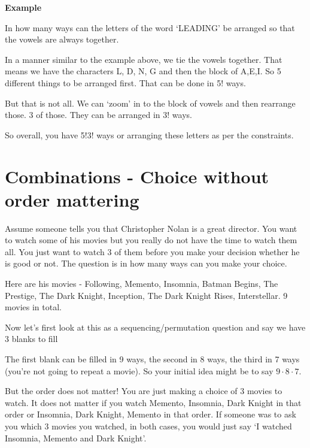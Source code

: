 \documentclass[12pt]{article}
\begin{document}
\medskip

\textbf{Example}

In how many ways can the letters of the word `LEADING' be arranged so that the vowels are always together.

In a manner similar to the example above, we tie the vowels together. That means we have the characters L, D, N, G and then the block of A,E,I. So 5 different things to be arranged first. 
That can be done in 5! ways. 

But that is not all. We can `zoom' in to the block of vowels and then rearrange those. 3 of those. They can be arranged in 3! ways.

So overall, you have 5!3! ways or arranging these letters as per the constraints.

\section*{Combinations - Choice without order mattering}

Assume someone tells you that Christopher Nolan is a great director. You want to watch some of his movies but you really do not have the time to watch them all. You just want to watch 3 of them before you make your decision whether he is good or not. The question is in how many ways can you make your choice.

Here are his movies - {Following, Memento, Insomnia, Batman Begins, The Prestige, The Dark Knight, Inception, The Dark Knight Rises, Interstellar}. 9 movies in total.

Now let's first look at this as a sequencing/permutation question and say we have 3 blanks to fill 

\underline{{\hspace{2cm}}} \hspace{0.5cm } \underline{{\hspace{2cm}}} \hspace{0.5cm} \underline{{\hspace{2cm}}} 

\vspace{1cm}

The first blank can be filled in 9 ways, the second in 8 ways, the third in 7 ways (you're not going to repeat a movie). So your initial idea might be to say $9 \cdot 8 \cdot 7$.

But the order does not matter! You are just making a choice of 3 movies to watch. It does not matter if you watch Memento, Insomnia, Dark Knight in that order or Insomnia, Dark Knight, Memento in that order. If someone was to ask you which 3 movies you watched, in both cases, you would just say `I watched Insomnia, Memento and Dark Knight'.
\end{document}

